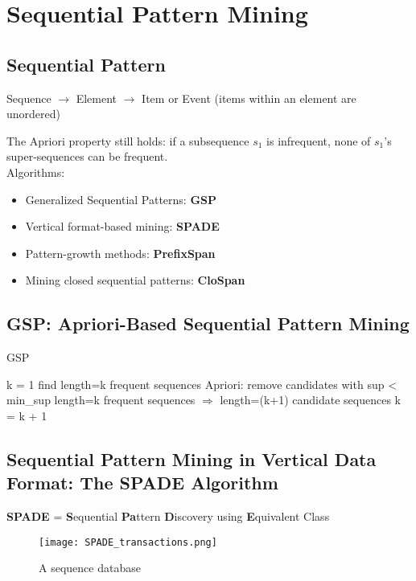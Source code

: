 \section{Sequential Pattern Mining}

\subsection{Sequential Pattern}
Sequence $\to$ Element $\to$ Item or Event (items within an element are unordered)

The Apriori property still holds: if a subsequence $s_1$ is infrequent, none of $s_1$’s super-sequences can be frequent.\\

Algorithms:
\begin{itemize}
\item Generalized Sequential Patterns: \textbf{GSP}
\item Vertical format-based mining: \textbf{SPADE}
\item Pattern-growth methods: \textbf{PrefixSpan}
\item Mining closed sequential patterns: \textbf{CloSpan}
\end{itemize}


\subsection{GSP: Apriori-Based Sequential Pattern Mining}

\begin{algorithm}
\caption{GSP}
\begin{algorithmic}
\State k = 1
\Repeat
    \State find length=k frequent sequences
    \State Apriori: remove candidates with sup < min\_sup
    \State length=k frequent sequences $\Rightarrow$ length=(k+1) candidate sequences
    \State k = k + 1
\end{algorithmic}
\end{algorithm}


\subsection{Sequential Pattern Mining in Vertical Data Format: The SPADE Algorithm}
\textbf{SPADE} = \textbf{S}equential \textbf{Pa}ttern \textbf{D}iscovery using \textbf{E}quivalent Class

\begin{figure}[H]
    \centering
    \texttt{[image: SPADE\_transactions.png]}
    \caption{A sequence database}
\end{figure}


